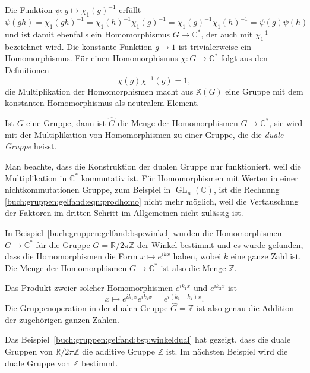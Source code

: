 Die Funktion $\psi\colon g\mapsto \chi_1(g)^{-1}$ erfüllt
\[
\psi(gh)
=
\chi_1(gh)^{-1}
=
\chi_1(h)^{-1}
\chi_1(g)^{-1}
=
\chi_1(g)^{-1}
\chi_1(h)^{-1}
=
\psi(g)
\psi(h)
\]
und ist damit ebenfalls ein Homomorphismus $G\to\mathbb{C}^*$, der auch
mit $\chi_1^{-1}$ bezeichnet wird.
Die konstante Funktion $g\mapsto 1$ ist trivialerweise ein Homomorphismus.
Für einen Homomorphismus $\chi\colon G\to\mathbb{C}^*$ folgt aus den
Definitionen
\[
\chi(g)\chi^{-1}(g) = 1,
\]
die Multiplikation der Homomorphismen macht aus $\mathbb{X}(G)$ eine
Gruppe mit dem konstanten Homomorphismus als neutralem Element.

\begin{definition}
Ist $G$ eine Gruppe, dann ist $\hat{G}$ die Menge der Homomorphismen
$G\to\mathbb{C}^*$, sie wird mit der Multiplikation von Homomorphismen
zu einer Gruppe, die die {\em duale Gruppe} heisst.
%
%
\end{definition}

Man beachte, dass die Konstruktion der dualen Gruppe nur funktioniert,
weil die Multiplikation in $\mathbb{C}^*$ kommutativ ist.
Für Homomorphismen mit Werten in einer nichtkommutationen Gruppe, zum
Beispiel in $\operatorname{GL}_n(\mathbb{C})$, ist die Rechnung
\eqref{buch:gruppen:gelfand:eqn:prodhomo} nicht mehr möglich, weil
die Vertauschung der Faktoren im dritten Schritt im Allgemeinen
nicht zulässig ist.

\begin{beispiel}
\label{buch:gruppen:gelfand:bsp:winkeldual}
In Beispiel~\ref{buch:gruppen:gelfand:bsp:winkel} wurden die Homomorphismen
$G\to\mathbb{C}^*$ für die Gruppe $G=\mathbb{R}/2\pi\mathbb{Z}$ der
Winkel bestimmt und es wurde gefunden, dass die Homomorphismen die Form
$x\mapsto e^{ikx}$ haben, wobei $k$ eine ganze Zahl ist.
Die Menge der Homomorphismen $G\to\mathbb{C}^*$ ist also die Menge $\mathbb{Z}$.

Das Produkt zweier solcher Homomorphismen $e^{ik_1x}$ und $e^{ik_2x}$ ist
\[
x\mapsto e^{ik_1x}e^{ik_2x} = e^{i(k_1+k_2)x}.
\]
Die Gruppenoperation in der dualen Gruppe $\hat{G}=\mathbb{Z}$ ist also
genau die Addition der zugehörigen ganzen Zahlen.
\end{beispiel}

Das Beispiel~\ref{buch:gruppen:gelfand:bsp:winkeldual} hat gezeigt,
dass die duale Gruppen von $\mathbb{R}/2\pi\mathbb{Z}$ die additive
Gruppe $\mathbb{Z}$ ist.
Im nächsten Beispiel wird die duale Gruppe von $\mathbb{Z}$ bestimmt.

